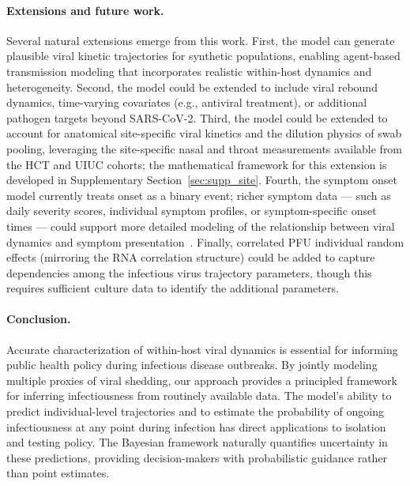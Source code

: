 \documentclass[12pt]{article}
\begin{document}
\paragraph{Extensions and future work.} Several natural extensions emerge from this work. First, the model can generate plausible viral kinetic trajectories for synthetic populations, enabling agent-based transmission modeling that incorporates realistic within-host dynamics and heterogeneity. Second, the model could be extended to include viral rebound dynamics, time-varying covariates (e.g., antiviral treatment), or additional pathogen targets beyond SARS-CoV-2. Third, the model could be extended to account for anatomical site-specific viral kinetics and the dilution physics of swab pooling, leveraging the site-specific nasal and throat measurements available from the HCT and UIUC cohorts; the mathematical framework for this extension is developed in Supplementary Section~\ref{sec:supp_site}. Fourth, the symptom onset model currently treats onset as a binary event; richer symptom data --- such as daily severity scores, individual symptom profiles, or symptom-specific onset times --- could support more detailed modeling of the relationship between viral dynamics and symptom presentation~\cite{hakki2026symptoms}. Finally, correlated PFU individual random effects (mirroring the RNA correlation structure) could be added to capture dependencies among the infectious virus trajectory parameters, though this requires sufficient culture data to identify the additional parameters.

\paragraph{Conclusion.} Accurate characterization of within-host viral dynamics is essential for informing public health policy during infectious disease outbreaks. By jointly modeling multiple proxies of viral shedding, our approach provides a principled framework for inferring infectiousness from routinely available data. The model's ability to predict individual-level trajectories and to estimate the probability of ongoing infectiousness at any point during infection has direct applications to isolation and testing policy. The Bayesian framework naturally quantifies uncertainty in these predictions, providing decision-makers with probabilistic guidance rather than point estimates.

\printbibliography

\clearpage

\end{document}
